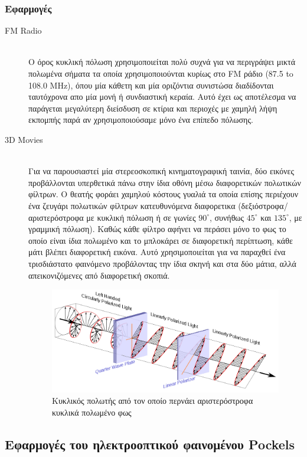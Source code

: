 \documentclass[a4paper,11pt,titlepage]{article}
\newcommand{\degrees}{^{\circ}}
\begin{document}
\subsubsection {Εφαρμογές}
\begin{description}
  \item[FM Radio] \hfill \\
Ο όρος κυκλική πόλωση χρησιμοποιείται πολύ συχνά για να περιγράψει μικτά πολωμένα σήματα τα οποία χρησιμοποιούνται κυρίως στο FM ράδιο (87.5 to 108.0 MHz), όπου μία κάθετη και μία οριζόντια συνιστώσα διαδίδονται ταυτόχρονα απο μία μονή ή συνδιαστική κεραία. Αυτό έχει ως αποτέλεσμα να παράγεται μεγαλύτερη διείσδυση σε κτίρια και περιοχές με χαμηλή λήψη εκπομπής παρά αν χρησιμοποιούσαμε μόνο ένα επίπεδο πόλωσης.
  \item[3D Movies] \hfill \\
Για να παρουσιαστεί μία στερεοσκοπική κινηματογραφική ταινία, δύο εικόνες προβάλλονται υπερθετικά πάνω στην ίδια οθόνη μέσω διαφορετικών πολωτικών φίλτρων. Ο θεατής φοράει χαμηλού κόστους γυαλιά τα οποία επίσης περιέχουν ένα ζευγάρι πολωτικών φίλτρων κατευθυνόμενα διαφορετικα (δεξιόστροφα/αριστερόστροφα με κυκλική πόλωση ή σε γωνίες $90\degrees$, συνήθως $45\degrees$ και $135\degrees$, με γραμμική πόλωση). Καθώς κάθε φίλτρο αφήνει να περάσει μόνο το φως το οποίο είναι ίδια πολωμένο και το μπλοκάρει σε διαφορετική περίπτωση, κάθε μάτι βλέπει διαφορετική εικόνα. Αυτό χρησιμοποιείται για να παραχθεί ένα τρισδιάστατο φαινόμενο προβάλοντας την ίδια σκηνή και στα δύο μάτια, αλλά απεικονιζόμενες από διαφορετική σκοπιά.
\begin{figure} [hb!]
\centering
\includegraphics[width=120mm]{3dglasses.png}
\caption{Κυκλικός πολωτής από τον οποίο περνάει αριστερόστροφα κυκλικά πολωμένο φως}
\end{figure}
\end{description}
\newpage

\subsection{Εφαρμογές του ηλεκτροοπτικού φαινομένου  Pockels}
\end{document}

